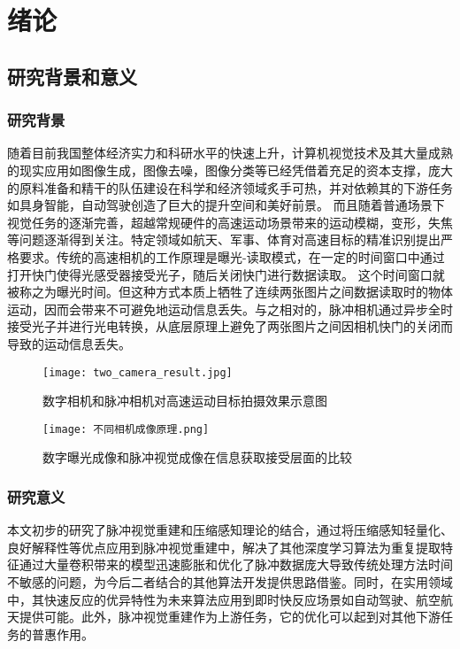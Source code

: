 
\chapter{绪论}

\section{研究背景和意义}

\subsection{研究背景}
随着目前我国整体经济实力和科研水平的快速上升，计算机视觉技术及其大量成熟的现实应用如图像生成，图像去噪，图像分类等已经凭借着充足的资本支撑，庞大的原料准备和精干的队伍建设在科学和经济领域炙手可热，并对依赖其的下游任务如具身智能，自动驾驶创造了巨大的提升空间和美好前景。
而且随着普通场景下视觉任务的逐渐完善，超越常规硬件的高速运动场景带来的运动模糊，变形，失焦等问题逐渐得到关注。特定领域如航天、军事、体育对高速目标的精准识别提出严格要求。传统的高速相机的工作原理是曝光-读取模式，在一定的时间窗口中通过打开快门使得光感受器接受光子，随后关闭快门进行数据读取。
这个时间窗口就被称之为曝光时间。但这种方式本质上牺牲了连续两张图片之间数据读取时的物体运动，因而会带来不可避免地运动信息丢失。与之相对的，脉冲相机通过异步全时接受光子并进行光电转换，从底层原理上避免了两张图片之间因相机快门的关闭而导致的运动信息丢失。

\begin{figure}[ht]
  \centering
  \texttt{[image: two\_camera\_result.jpg]}
  \caption{数字相机和脉冲相机对高速运动目标拍摄效果示意图}
  \label{fig:two_camera_result}
\end{figure}    
\begin{figure}[ht]
  \centering
  \texttt{[image: 不同相机成像原理.png]}
  \caption{数字曝光成像和脉冲视觉成像在信息获取接受层面的比较}
  \label{fig:two_camera_result_tenet}
\end{figure}    
\subsection{研究意义}
本文初步的研究了脉冲视觉重建和压缩感知理论的结合，通过将压缩感知轻量化、良好解释性等优点应用到脉冲视觉重建中，解决了其他深度学习算法为重复提取特征通过大量卷积带来的模型迅速膨胀和优化了脉冲数据庞大导致传统处理方法时间不敏感的问题，为今后二者结合的其他算法开发提供思路借鉴。同时，在实用领域中，其快速反应的优异特性为未来算法应用到即时快反应场景如自动驾驶、航空航天提供可能。此外，脉冲视觉重建作为上游任务，它的优化可以起到对其他下游任务的普惠作用。


